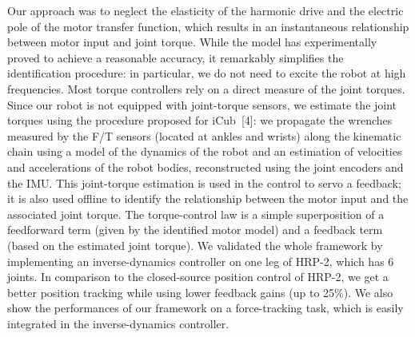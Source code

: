 Our approach was to neglect the elasticity of the harmonic drive and the electric pole of the motor transfer function, which results in an instantaneous relationship between motor input and joint torque. 
While the model has experimentally proved to achieve a reasonable accuracy, it remarkably simplifies the identification procedure: in particular, we do not need to excite the robot at high frequencies. 
Most torque controllers rely on a direct measure of the joint torques. 
Since our robot is not equipped with joint-torque sensors, we estimate the joint torques using the procedure proposed for iCub~[4]: we propagate the wrenches measured by the F/T sensors (located at ankles and wrists) along the kinematic chain using a model of the dynamics of the robot and an estimation of velocities and accelerations of the robot bodies, reconstructed using the joint encoders and the IMU. 
This joint-torque estimation is used in the control to servo a feedback; it is also used offline to identify the relationship between the motor input and the associated joint torque. 
The torque-control law is a simple superposition of a feedforward term (given by the identified motor model) and a feedback term (based on the estimated joint torque). 
We validated the whole framework by implementing an inverse-dynamics controller on one leg of HRP-2, which has 6 joints. 
In comparison to the closed-source position control of HRP-2, we get a better position tracking while using lower feedback gains (up to 25\%). 
We also show the performances of our framework on a force-tracking task, which is easily integrated in the inverse-dynamics controller.
